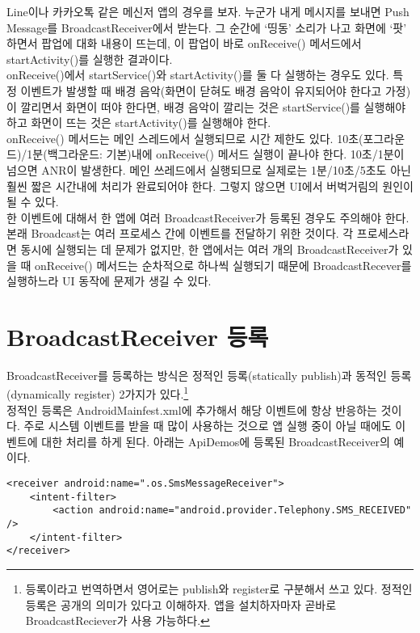 Line이나 카카오톡 같은 메신저 앱의 경우를 보자. 누군가 내게 메시지를 보내면 Push Message를 BroadcastReceiver에서 받는다. 그 순간에 `띵동' 소리가 나고 화면에 `팟' 하면서 팝업에 대화 내용이 뜨는데, 이 팝업이 바로 onReceive() 메서드에서 startActivity()를 실행한 결과이다.\\

onReceive()에서 startService()와 startActivity()를 둘 다 실행하는 경우도 있다. 특정 이벤트가 발생할 때 배경 음악(화면이 닫혀도 배경 음악이 유지되어야 한다고 가정)이 깔리면서 화면이 떠야 한다면, 배경 음악이 깔리는 것은 startService()를 실행해야 하고 화면이 뜨는 것은 startActivity()를 실행해야 한다.\\

onReceive() 메서드는 메인 스레드에서 실행되므로 시간 제한도 있다.
10초(포그라운드)/1분(백그라운드: 기본)내에 onReceive() 메서드 실행이 끝나야 한다. 10초/1분이 넘으면 ANR이 발생한다.
메인 쓰레드에서 실행되므로 실제로는 1분/10초/5초도 아닌 훨씬 짧은 시간내에 처리가 완료되어야 한다. 그렇지 않으면 UI에서 버벅거림의 원인이 될 수 있다.\\

한 이벤트에 대해서 한 앱에 여러 BroadcastReceiver가 등록된 경우도 주의해야 한다.
본래 Broadcast는 여러 프로세스 간에 이벤트를 전달하기 위한 것이다. 각 프로세스라면 동시에 실행되는 데 문제가  없지만, 한 앱에서는 여러 개의 BroadcastReceiver가 있을 때 onReceive() 메서드는 순차적으로 하나씩 실행되기 때문에 BroadcastRecever를 실행하느라 UI 동작에 문제가 생길 수 있다.\\

\begin{comment}
어떤 앱에서는 Application에만 registerReceiver를 해놓는 경우도 있다. BroadcastReceiver를 최소한의 갯수로 하고, 최소한의 시간만 존재하도록 하는 것이 BroadcastReciever로 인해 UI가 버벅거리지 않게 하는 방법이다.
\end{comment}

\section{BroadcastReceiver 등록}
BroadcastReceiver를 등록하는 방식은 정적인 등록(statically publish)과 동적인 등록(dynamically register) 2가지가 있다.\footnote{등록이라고 번역하면서 영어로는 publish와 register로 구분해서 쓰고 있다. 정적인 등록은 공개의 의미가 있다고 이해하자. 앱을 설치하자마자 곧바로 BroadcastReciever가 사용 가능하다.}\\

정적인 등록은 AndroidMainfest.xml에 추가해서 해당 이벤트에 항상 반응하는 것이다. 주로 시스템 이벤트를 받을 때 많이 사용하는 것으로 앱 실행 중이 아닐 때에도 이벤트에 대한 처리를 하게 된다.
아래는 ApiDemos에 등록된 BroadcastReceiver의 예이다.
\begin{lstlisting}[frame=single] 
<receiver android:name=".os.SmsMessageReceiver">
	<intent-filter>
		<action android:name="android.provider.Telephony.SMS_RECEIVED" />
	</intent-filter>
</receiver>
\end{lstlisting}

